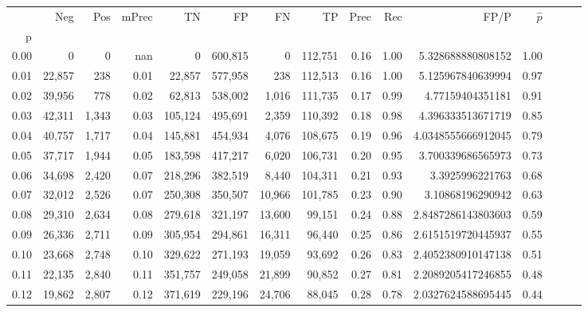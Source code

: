 \begin{tabular}{rrrrrrrrrrrrrrr}
\toprule
{} &     Neg &    Pos & mPrec &       TN &       FP &       FN &       TP &  Prec &   Rec &                    FP/P & $\hat{p}$ \\
p    &         &        &       &          &          &          &          &       &       &                         &           \\
\midrule
0.00 &       0 &      0 &   nan &        0 &  600,815 &        0 &  112,751 &  0.16 &  1.00 &       5.328688880808152 &      1.00 \\
0.01 &  22,857 &    238 &  0.01 &   22,857 &  577,958 &      238 &  112,513 &  0.16 &  1.00 &       5.125967840639994 &      0.97 \\
0.02 &  39,956 &    778 &  0.02 &   62,813 &  538,002 &    1,016 &  111,735 &  0.17 &  0.99 &        4.77159404351181 &      0.91 \\
0.03 &  42,311 &  1,343 &  0.03 &  105,124 &  495,691 &    2,359 &  110,392 &  0.18 &  0.98 &       4.396333513671719 &      0.85 \\
0.04 &  40,757 &  1,717 &  0.04 &  145,881 &  454,934 &    4,076 &  108,675 &  0.19 &  0.96 &      4.0348555666912045 &      0.79 \\
0.05 &  37,717 &  1,944 &  0.05 &  183,598 &  417,217 &    6,020 &  106,731 &  0.20 &  0.95 &       3.700339686565973 &      0.73 \\
0.06 &  34,698 &  2,420 &  0.07 &  218,296 &  382,519 &    8,440 &  104,311 &  0.21 &  0.93 &         3.3925996221763 &      0.68 \\
0.07 &  32,012 &  2,526 &  0.07 &  250,308 &  350,507 &   10,966 &  101,785 &  0.23 &  0.90 &        3.10868196290942 &      0.63 \\
0.08 &  29,310 &  2,634 &  0.08 &  279,618 &  321,197 &   13,600 &   99,151 &  0.24 &  0.88 &      2.8487286143803603 &      0.59 \\
0.09 &  26,336 &  2,711 &  0.09 &  305,954 &  294,861 &   16,311 &   96,440 &  0.25 &  0.86 &      2.6151519720445937 &      0.55 \\
0.10 &  23,668 &  2,748 &  0.10 &  329,622 &  271,193 &   19,059 &   93,692 &  0.26 &  0.83 &      2.4052380910147138 &      0.51 \\
0.11 &  22,135 &  2,840 &  0.11 &  351,757 &  249,058 &   21,899 &   90,852 &  0.27 &  0.81 &      2.2089205417246855 &      0.48 \\
0.12 &  19,862 &  2,807 &  0.12 &  371,619 &  229,196 &   24,706 &   88,045 &  0.28 &  0.78 &      2.0327624588695445 &      0.44 \\

\end{tabular}
